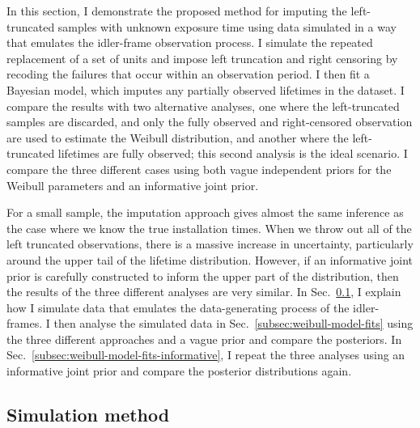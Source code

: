In this section, I demonstrate the proposed method for imputing the left-truncated samples with unknown exposure time using data simulated in a way that emulates the idler-frame observation process. I simulate the repeated replacement of a set of units and impose left truncation and right censoring by recoding the failures that occur within an observation period. I then fit a Bayesian model, which imputes any partially observed lifetimes in the dataset. I compare the results with two alternative analyses, one where the left-truncated samples are discarded, and only the fully observed and right-censored observation are used to estimate the Weibull distribution, and another where the left-truncated lifetimes are fully observed; this second analysis is the ideal scenario. I compare the three different cases using both vague independent priors for the Weibull parameters and an informative joint prior.

For a small sample, the imputation approach gives almost the same inference as the case where we know the true installation times. When we throw out all of the left truncated observations, there is a massive increase in uncertainty, particularly around the upper tail of the lifetime distribution. However, if an informative joint prior is carefully constructed to inform the upper part of the distribution, then the results of the three different analyses are very similar. In Sec.~\ref{subsec:sim-method-weibull}, I explain how I simulate data that emulates the data-generating process of the idler-frames. I then analyse the simulated data in Sec.~\ref{subsec:weibull-model-fits} using the three different approaches and a vague prior and compare the posteriors. In Sec.~\ref{subsec:weibull-model-fits-informative}, I repeat the three analyses using an informative joint prior and compare the posterior distributions again.

\subsection{Simulation method} \label{subsec:sim-method-weibull}

